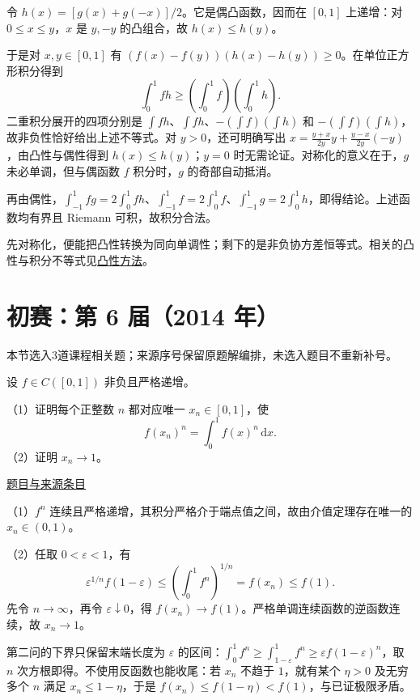 \documentclass[12pt,fontset=fandol]{ctexart}
\begin{document}
\begin{solve}\label{ans:pre05-math:5}

令 $h(x)=[g(x)+g(-x)]/2$。它是偶凸函数，因而在 $[0,1]$ 上递增：对 $0\le x\le y$，$x$ 是 $y,-y$ 的凸组合，故 $h(x)\le h(y)$。

于是对 $x,y\in[0,1]$ 有 $(f(x)-f(y))(h(x)-h(y))\ge0$。在单位正方形积分得到
\[
\int_0^1fh\ge\left(\int_0^1f\right)\left(\int_0^1h\right).
\]
二重积分展开的四项分别是 $\int fh$、$\int fh$、$-(\int f)(\int h)$ 和 $-(\int f)(\int h)$，故非负性恰好给出上述不等式。对 $y>0$，还可明确写出 $x=\frac{y+x}{2y}y+\frac{y-x}{2y}(-y)$，由凸性与偶性得到 $h(x)\le h(y)$；$y=0$ 时无需论证。对称化的意义在于，$g$ 未必单调，但与偶函数 $f$ 积分时，$g$ 的奇部自动抵消。

再由偶性，$\int_{-1}^1fg=2\int_0^1fh$、$\int_{-1}^1f=2\int_0^1f$、$\int_{-1}^1g=2\int_0^1h$，即得结论。上述函数均有界且 Riemann 可积，故积分合法。

\end{solve}

\begin{remark}[方法与条件]先对称化，便能把凸性转换为同向单调性；剩下的是非负协方差恒等式。相关的凸性与积分不等式见\hyperref[app:estimate-convexity]{凸性方法}。\end{remark}

\section{初赛：第 6 届（2014 年）}

本节选入3道课程相关题；来源序号保留原题解编排，未选入题目不重新补号。

\begin{example}[来源序号2]\label{ex:pre06-math:2}\label{pr:pre06-math:2}

设 $f\in C([0,1])$ 非负且严格递增。

（1）证明每个正整数 $n$ 都对应唯一 $x_n\in[0,1]$，使
\[
f(x_n)^n=\int_0^1f(x)^n\,\mathrm dx.
\]
（2）证明 $x_n\to1$。

\par\href{https://github.com/lzxcr/cmc-mathematics/blob/64916fa1fdbc3e444a652eca204d5669058ee321/src/problems/preliminary/06/02.md}{题目与来源条目}

\end{example}

\begin{solve}\label{ans:pre06-math:2}

（1）$f^n$ 连续且严格递增，其积分严格介于端点值之间，故由介值定理存在唯一的 $x_n\in(0,1)$。

（2）任取 $0<\varepsilon<1$，有
\[
\varepsilon^{1/n}f(1-\varepsilon)
\le\left(\int_0^1f^n\right)^{1/n}=f(x_n)\le f(1).
\]
先令 $n\to\infty$，再令 $\varepsilon\downarrow0$，得 $f(x_n)\to f(1)$。严格单调连续函数的逆函数连续，故 $x_n\to1$。

第二问的下界只保留末端长度为 $\varepsilon$ 的区间：$\int_0^1 f^n\ge\int_{1-\varepsilon}^1f^n\ge\varepsilon f(1-\varepsilon)^n$，取 $n$ 次方根即得。不使用反函数也能收尾：若 $x_n$ 不趋于 $1$，就有某个 $\eta>0$ 及无穷多个 $n$ 满足 $x_n\le1-\eta$，于是 $f(x_n)\le f(1-\eta)<f(1)$，与已证极限矛盾。

\end{solve}
\end{document}
